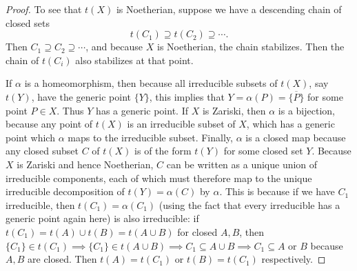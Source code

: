 \begin{proof}
	To see that $t(X) $ is Noetherian, suppose we have a descending chain of closed sets
	\[
		t(C_{1}) \supseteq t(C_{2}) \supseteq \cdots
	.\]
	Then $C_{1} \supseteq C_{2} \supseteq \cdots $, and because $X $ is Noetherian, the chain stabilizes.
	Then the chain of $t(C_i) $ also stabilizes at that point.

	If $\alpha $ is a homeomorphism, then because all irreducible subsets of $t(X) $, say $t(Y) $, have the generic point $\{Y\}   $, this implies that $Y = \alpha(P) = \overline{\{P\} } $ for some point $P \in X $.
	Thus $Y $ has a generic point.
	If $X $ is Zariski, then $\alpha $ is a bijection, because any point of $t(X) $ is an irreducible subset of $X $, which has a generic point which $\alpha $ maps to the irreducible subset.
	Finally, $\alpha $ is a closed map because any closed subset $C $ of $t(X) $ is of the form $t(Y) $ for some closed set $Y $.
	Because $X $ is Zariski and hence Noetherian, $C $ can be written as a unique union of irreducible components, each of which must therefore map to the unique irreducible decomposition of $t(Y) = \alpha(C)$ by $\alpha $.
	This is because if we have $C_{1} $ irreducible, then $t(C_{1}) = \alpha(C_{1}) $ (using the fact that every irreducible has a generic point again here) is also irreducible: if $t(C_{1}) = t(A) \cup t(B) = t(A\cup B) $ for closed $A,B $, then $\{C_{1}\}  \in t(C_{1}) \implies \{C_{1}\}  \in t(A\cup B) \implies C_{1} \subseteq A\cup B \implies C_{1} \subseteq A$ or $B $ because $A,B $ are closed.
	Then $t(A) = t(C_{1}) $ or $t(B) = t(C_{1}) $ respectively.
\end{proof}

